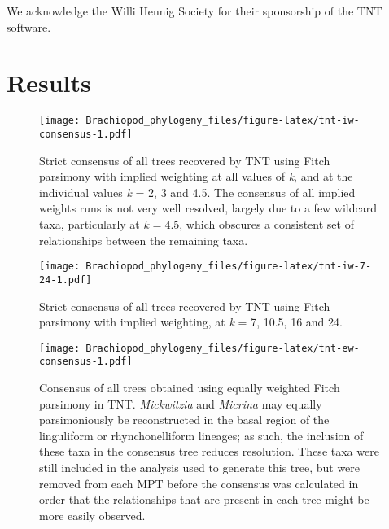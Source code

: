\documentclass[openany]{book}
\theoremstyle{definition}
\theoremstyle{definition}
\theoremstyle{definition}
\theoremstyle{remark}
\begin{document}
We acknowledge the Willi Hennig Society for their sponsorship of the TNT
software.

\section{Results}\label{results-1}









\begin{figure}
\centering
\texttt{[image: Brachiopod\_phylogeny\_files/figure-latex/tnt-iw-consensus-1.pdf]}
\caption{\label{fig:tnt-iw-consensus}Strict consensus of all trees recovered by TNT
using Fitch parsimony with implied weighting at all values of \emph{k}, and at the individual
values \emph{k} = 2, 3 and 4.5.
The consensus of all implied weights runs is
not very well resolved, largely due to a few wildcard taxa, particularly
at \(k = 4.5\), which obscures a consistent set of relationships between
the remaining taxa.}
\end{figure}

\begin{figure}
\centering
\texttt{[image: Brachiopod\_phylogeny\_files/figure-latex/tnt-iw-7-24-1.pdf]}
\caption{\label{fig:tnt-iw-7-24}Strict consensus of all trees recovered by TNT
using Fitch parsimony with implied weighting, at \emph{k} = 7, 10.5, 16 and 24.}
\end{figure}

\newpage










\begin{figure}
\centering
\texttt{[image: Brachiopod\_phylogeny\_files/figure-latex/tnt-ew-consensus-1.pdf]}
\caption{\label{fig:tnt-ew-consensus}Consensus of all trees obtained using equally weighted
Fitch parsimony in TNT. \emph{Mickwitzia} and \emph{Micrina} may equally
parsimoniously be reconstructed in the basal region of the linguliform
or rhynchonelliform lineages; as such, the inclusion of these taxa in
the consensus tree reduces resolution. These taxa were still included in
the analysis used to generate this tree, but were removed from each MPT
before the consensus was calculated in order that the relationships that
are present in each tree might be more easily observed.}
\end{figure}
\end{document}
